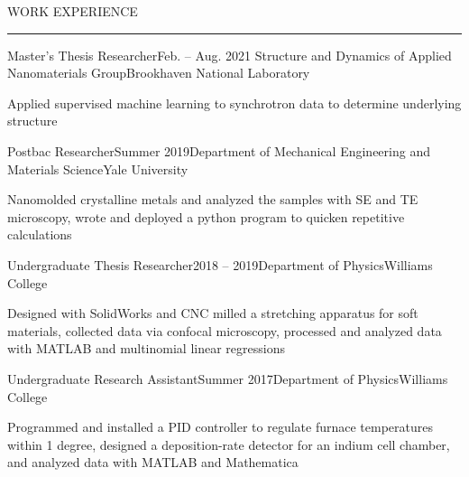 \documentclass{short_resume} %
\renewenvironment{rSection}[1]{
	\sectionskip
	\textcolor{RoyalPurple}{\MakeUppercase{#1}}
	\sectionlineskip
	\hrule
	\begin{list}{}{
			\setlength{\leftmargin}{1.5em}
		}
		\item[]
	}{
	\end{list}
}
\begin{document}
\vspace{-1em}		
	\begin{rSection}{Work Experience}
			\begin{rSubsection}{Master's Thesis Researcher}{Feb. -- Aug. 2021}{ Structure and Dynamics of Applied Nanomaterials Group}{Brookhaven National Laboratory}
			\item[] Applied supervised machine learning to synchrotron data to determine underlying structure
			\vspace{-.2em}
		\end{rSubsection}
		\vspace{-.2em}
		\begin{rSubsection}{Postbac Researcher}{Summer 2019}{Department of Mechanical Engineering and Materials Science}{Yale University}
			\item[] Nanomolded crystalline metals and analyzed the samples with SE and TE microscopy, wrote and deployed a python program to quicken repetitive calculations 
			\vspace{-.2em}
		\end{rSubsection}
		\vspace{-.2em}
		\begin{rSubsection}{Undergraduate Thesis Researcher}{2018 -- 2019}{Department of Physics}{Williams College}
			\item[] Designed with SolidWorks and CNC milled a stretching apparatus for soft materials, collected data via confocal microscopy, processed and analyzed data with MATLAB and multinomial linear regressions
		\end{rSubsection}
		\vspace{-.2em}
		\begin{rSubsection}{Undergraduate Research Assistant}{Summer 2017}{Department of Physics}{Williams College}
			\item[] Programmed and installed a PID controller to regulate furnace temperatures within 1 degree, designed a deposition-rate detector for an indium cell chamber, and analyzed data with MATLAB and Mathematica
		\end{rSubsection}


\end{rSection}
\end{document}
